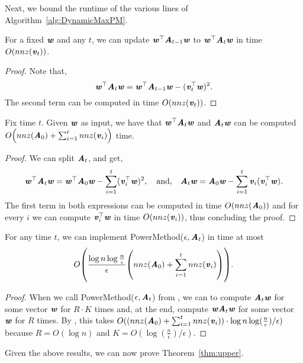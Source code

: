 Next, we bound the runtime of the various lines of Algorithm~\ref{alg:DynamicMaxPM}. 
%
\begin{lemma}\label{lem:SameW}
For a fixed $\ww$ and any $t$, we can update $\ww^{\top}\AA_{t-1}\ww$ to $\ww^{\top}\AA_t\ww$ in time $O(nnz(\vv_t))$.
\end{lemma}
\begin{proof}
Note that,
\[
\ww^{\top}\AA_t\ww = \ww^{\top}\AA_{t-1}\ww - (\vv_t^{\top}\ww)^2.
\]
The second term can be computed in time $O(nnz(\vv_t))$.
\end{proof}
%
\begin{lemma}\label{lem:DiffW}
Fix time $t$. Given $\ww$ as input, we have that $\ww^{\top}\AA_t\ww$ and $\AA_t\ww$ can be computed $O\left(nnz(\AA_0) +\sum_{i=1}^t nnz(\vv_i)\right)$ time.
\end{lemma}
\begin{proof}
We can split $\AA_t$, and get,
\[
\ww^{\top}\AA_t\ww = \ww^{\top}\AA_0\ww - \sum_{i=1}^t (\vv_i^{\top}\ww)^2,\quad \text{and,}\quad
\AA_t\ww = \AA_0\ww - \sum_{i=1}^t \vv_i(\vv_i^{\top}\ww).
\]
The first term in both expressions can be computed in time $O(nnz(\AA_0))$ and for every $i$ we can compute $\vv_i^{\top}\ww$ in time $O(nnz(\vv_i))$, thus concluding the proof.
\end{proof}
%
\begin{lemma}\label{lem:PMt}For any time $t$, we can implement {\sc PowerMethod}($\epsilon,\AA_t$) in time at most 
\[
O\left(\frac{\log n\log \frac{n}{\epsilon}}{\epsilon}\left(nnz(\AA_0) +\sum_{i=1}^t nnz(\vv_i)\right)\right).
\]
\end{lemma}
\begin{proof}
When we call {\sc PowerMethod}($\epsilon,\AA_t$) from , we can to compute $\AA_t\ww$ for some vector $\ww$ for $R\cdot K$ times and, at the end, compute $\ww \AA_t\ww$ for some vector $\ww$ for $R$ times. 
By , this takes $O( (nnz(\AA_0) +\sum_{i=1}^t nnz(\vv_i) ) \cdot \log n\log (\frac{n}{\epsilon})/\epsilon)$ because $R = O(\log n)$ and $K = O(\log(\frac{n}{\epsilon})/\epsilon)$.
%

\end{proof}

 Given the above results, we can now prove Theorem~\ref{thm:upper}.

